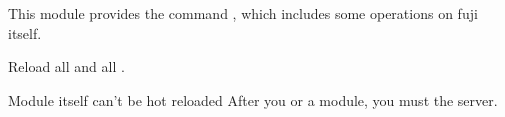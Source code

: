 
This module provides the command , which includes some operations on fuji itself.

Reload all  and all .

\begin{note}{Module itself can't be hot reloaded}
    After you  or  a module, you must  the server.
\end{note}


